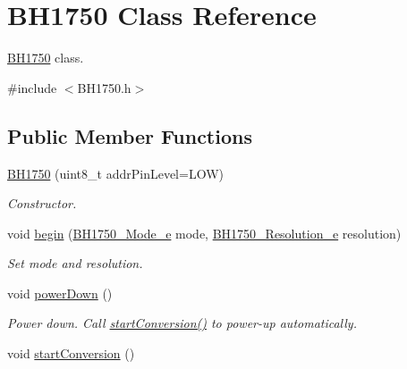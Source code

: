 \hypertarget{class_b_h1750}{}\section{B\+H1750 Class Reference}
\label{class_b_h1750}


\hyperlink{class_b_h1750}{B\+H1750} class.  




{\ttfamily \#include $<$B\+H1750.\+h$>$}

\subsection*{Public Member Functions}
\begin{DoxyCompactItemize}
\item 
\hyperlink{class_b_h1750_aa0f66027401db3cd8eb849456b820c39}{B\+H1750} (uint8\+\_\+t addr\+Pin\+Level=L\+OW)
\begin{DoxyCompactList}\small\item\em Constructor. \end{DoxyCompactList}\item 
void \hyperlink{class_b_h1750_aa32b8ff6bf4d7888f776bc42303075a2}{begin} (\hyperlink{_b_h1750_8h_adcb5f510996efd1d596b2e65ffc7892b}{B\+H1750\+\_\+\+Mode\+\_\+e} mode, \hyperlink{_b_h1750_8h_a596339813d6a64d82e6477f6b7825b3d}{B\+H1750\+\_\+\+Resolution\+\_\+e} resolution)
\begin{DoxyCompactList}\small\item\em Set mode and resolution. \end{DoxyCompactList}\item 
void \hyperlink{class_b_h1750_ae9c0efac4daa5a16c1a732c0aafbc6c0}{power\+Down} ()\hypertarget{class_b_h1750_ae9c0efac4daa5a16c1a732c0aafbc6c0}{}\label{class_b_h1750_ae9c0efac4daa5a16c1a732c0aafbc6c0}

\begin{DoxyCompactList}\small\item\em Power down. Call \hyperlink{class_b_h1750_ae637c8d230c873bc22ee836a7f878dfe}{start\+Conversion()} to power-\/up automatically. \end{DoxyCompactList}\item 
void \hyperlink{class_b_h1750_ae637c8d230c873bc22ee836a7f878dfe}{start\+Conversion} ()\hypertarget{class_b_h1750_ae637c8d230c873bc22ee836a7f878dfe}{}\label{class_b_h1750_ae637c8d230c873bc22ee836a7f878dfe}


\end{DoxyCompactItemize}
